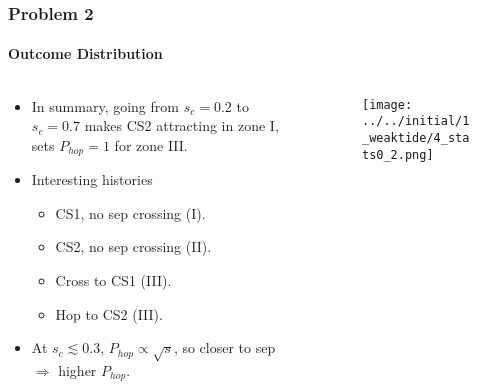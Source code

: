 \documentclass[dvipsnames, 11pt]{beamer}
\begin{document}
\begin{frame}
    \frametitle{Problem 2}
    \framesubtitle{Outcome Distribution}

    \begin{columns}
        \begin{column}{0.5\textwidth}
            \begin{itemize}
                \item In summary, going from $s_c = 0.2$ to $s_c = 0.7$ makes
                    CS2 attracting in zone I, sets $P_{hop} = 1$ for zone III\@.

                \item Interesting histories
                    \begin{itemize}
                        \item CS1, no sep crossing (I).
                        \item CS2, no sep crossing (II).
                        \item Cross to CS1 (III).
                        \item Hop to CS2 (III).
                    \end{itemize}

                \item At $s_c \lesssim 0.3$, $P_{hop} \propto \sqrt{s}$, so
                    closer to sep $\Rightarrow$ higher $P_{hop}$.
            \end{itemize}
        \end{column}
        \begin{column}{0.5\textwidth}
            \begin{figure}[t]
                \centering
                \texttt{[image: ../../initial/1\_weaktide/4\_stats0\_2.png]}
            \end{figure}
        \end{column}
    \end{columns}
\end{frame}
\end{document}
